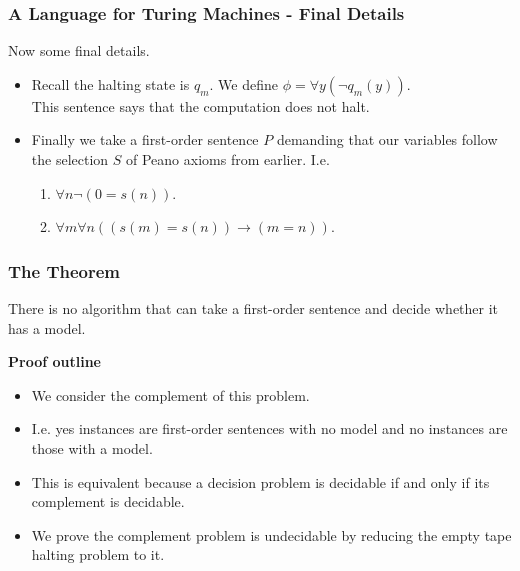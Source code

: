 \documentclass[handout]{beamer}
\newcommand{\ra}{\rightarrow}
\begin{document}
\begin{frame}
\frametitle{A Language for Turing Machines - Final Details} 
Now some final details.\vspace{0.5cm}
\begin{itemize}
\item Recall the halting state is $q_m$. We define $\phi = \forall y (\neg q_m(y))$.\\
This sentence says that the computation does not halt.
\vspace{0.5cm}
\item Finally we take a first-order sentence $P$ demanding that our variables follow the selection $S$ of Peano axioms from earlier. I.e.
\vspace{0.5cm}
\begin{enumerate}
\item $\forall n \neg (0 =s(n))$.
\vspace{0.5cm}
\item $\forall m\forall n((s(m)=s(n))\ra (m =n))$.
\end{enumerate}
\end{itemize}
\end{frame}

\begin{frame}
\frametitle{The Theorem} 
\begin{theorem}\label{T:ent}
There is no algorithm that can take a first-order sentence and decide whether it has a model.
\end{theorem}
\textbf{Proof outline}
\begin{itemize} 
\item We consider the complement of this problem. 
\item I.e. yes instances are first-order sentences with no model and no instances are those with a model. 
\item This is equivalent because a decision problem is decidable if and only if its complement is decidable. 
\item We prove the complement problem is undecidable by reducing the empty tape halting problem to it. 
\end{itemize}  
\end{frame}
\end{document}
